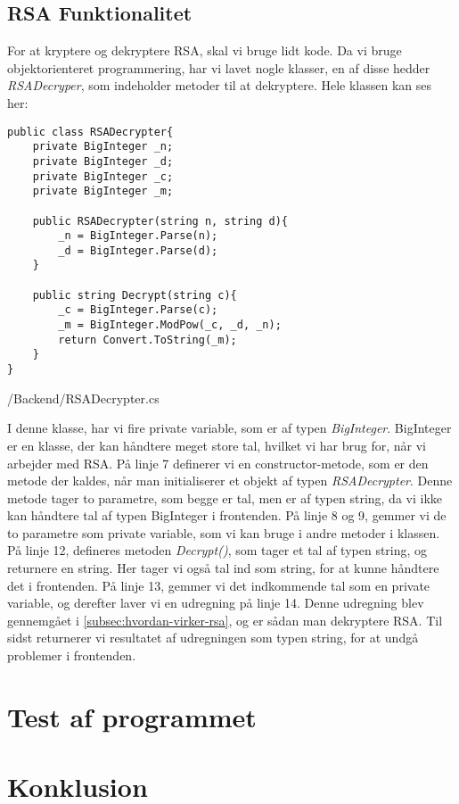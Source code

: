 \documentclass[a4paper,12pt]{extarticle}
\begin{document}
    \subsection{RSA Funktionalitet}\label{subsec:rsa-functionality}
    For at kryptere og dekryptere RSA, skal vi bruge lidt kode.
    Da vi bruge objektorienteret programmering, har vi lavet nogle klasser, en af disse hedder \emph{RSADecryper},
    som indeholder metoder til at dekryptere.
    Hele klassen kan ses her:
    \begin{listing}[!ht]
    \begin{verbatim}
public class RSADecrypter{
    private BigInteger _n;
    private BigInteger _d;
    private BigInteger _c;
    private BigInteger _m;
    
    public RSADecrypter(string n, string d){
        _n = BigInteger.Parse(n);
        _d = BigInteger.Parse(d);
    }
    
    public string Decrypt(string c){
        _c = BigInteger.Parse(c);
        _m = BigInteger.ModPow(_c, _d, _n);
        return Convert.ToString(_m);
    }
}
    \end{verbatim}
    \caption{/Backend/RSADecrypter.cs}
    \end{listing}
    
    I denne klasse, har vi fire private variable, som er af typen \emph{BigInteger}.
    BigInteger er en klasse, der kan håndtere meget store tal, hvilket vi har brug for, når vi arbejder med RSA.\@
    På linje 7 definerer vi en constructor-metode, som er den metode der kaldes,
    når man initialiserer et objekt af typen \emph{RSADecrypter}.
    Denne metode tager to parametre, som begge er tal, men er af typen string,
    da vi ikke kan håndtere tal af typen BigInteger i frontenden.
    På linje 8 og 9, gemmer vi de to parametre som private variable, som vi kan bruge i andre metoder i klassen.\@
    På linje 12, defineres metoden \emph{Decrypt()}, som tager et tal af typen string, og returnere en string.
    Her tager vi også tal ind som string, for at kunne håndtere det i frontenden.
    På linje 13, gemmer vi det indkommende tal som en private variable, og derefter laver vi en udregning på linje 14.
    Denne udregning blev gennemgået i \autoref{subsec:hvordan-virker-rsa}, og er sådan man dekryptere RSA.\@
    Til sidst returnerer vi resultatet af udregningen som typen string, for at undgå problemer i frontenden.\@

    \section{Test af programmet}\label{sec:test}
    \section{Konklusion}\label{sec:konklusion}
\end{document}
